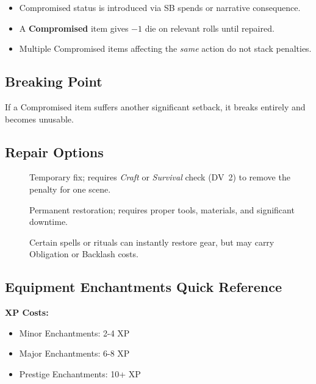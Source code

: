 \begin{itemize}
\item Compromised status is introduced via SB spends or narrative consequence. 
\item A \textbf{Compromised} item gives $-1$ die on relevant rolls until repaired. 
\item Multiple Compromised items affecting the \emph{same} action do not stack penalties.
\end{itemize}

\subsection{Breaking Point}
\label{subsec:gear-breaking}

If a Compromised item suffers another significant setback, it breaks entirely and becomes unusable.

\subsection{Repair Options}
\label{subsec:gear-repair}

\begin{description}
\item[] Temporary fix; requires \emph{Craft} or \emph{Survival} check (DV~2) to remove the penalty for one scene. 
\item[] Permanent restoration; requires proper tools, materials, and significant downtime. 
\item[] Certain spells or rituals can instantly restore gear, but may carry Obligation or Backlash costs. 
\end{description}

\subsection*{Equipment Enchantments Quick Reference}

\textbf{XP Costs:}
\begin{itemize}
\item Minor Enchantments: 2-4 XP
\item Major Enchantments: 6-8 XP
\item Prestige Enchantments: 10+ XP
\end{itemize}

